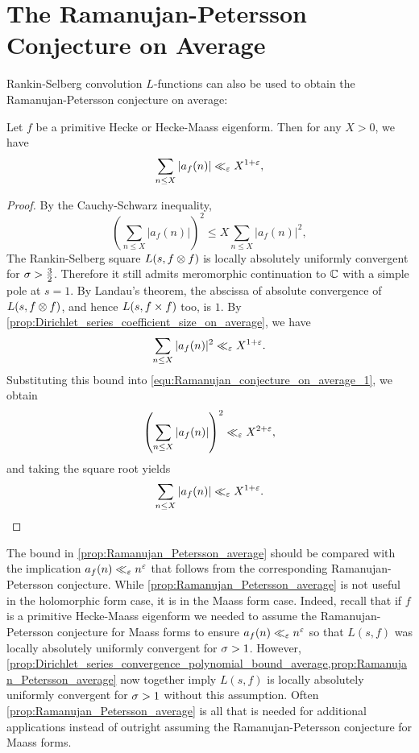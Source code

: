   \section{The Ramanujan-Petersson Conjecture on Average}
    Rankin-Selberg convolution $L$-functions can also be used to obtain the Ramanujan-Petersson conjecture on average:

    \begin{proposition}\label{prop:Ramanujan_Petersson_average}
      Let $f$ be a primitive Hecke or Hecke-Maass eigenform. Then for any $X > 0$, we have
      \[
      \sum_{n \le X}|a_{f}(n)| \ll_{\varepsilon} X^{1+\varepsilon},
      \]
    \end{proposition}
    \begin{proof}
      By the Cauchy-Schwarz inequality,
      \begin{equation}\label{equ:Ramanujan_conjecture_on_average_1}
        \left(\sum_{n \le X}|a_{f}(n)|\right)^{2} \le X\sum_{n \le X}|a_{f}(n)|^{2},
      \end{equation}
      The Rankin-Selberg square $L(s,f \otimes f)$ is locally absolutely uniformly convergent for $\sigma > \frac{3}{2}$. Therefore it still admits meromorphic continuation to $\mathbb{C}$ with a simple pole at $s = 1$. By Landau's theorem, the abscissa of absolute convergence of $L(s,f \otimes f)$, and hence $L(s,f \times f)$ too, is $1$. By \cref{prop:Dirichlet_series_coefficient_size_on_average}, we have
      \[
        \sum_{n \le X}|a_{f}(n)|^{2} \ll_{\varepsilon} X^{1+\varepsilon}.
      \]
      Substituting this bound into \cref{equ:Ramanujan_conjecture_on_average_1}, we obtain
      \[
        \left(\sum_{n \le X}|a_{f}(n)|\right)^{2} \ll_{\varepsilon} X^{2+\varepsilon},
      \]
      and taking the square root yields
      \[
        \sum_{n \le X}|a_{f}(n)| \ll_{\varepsilon} X^{1+\varepsilon}.
      \]
    \end{proof}

    The bound in \cref{prop:Ramanujan_Petersson_average} should be compared with the implication $a_{f}(n) \ll_{\varepsilon} n^{\varepsilon}$ that follows from the corresponding Ramanujan-Petersson conjecture. While \cref{prop:Ramanujan_Petersson_average} is not useful in the holomorphic form case, it is in the Maass form case. Indeed, recall that if $f$ is a primitive Hecke-Maass eigenform we needed to assume the Ramanujan-Petersson conjecture for Maass forms to ensure $a_{f}(n) \ll_{\varepsilon} n^{\varepsilon}$ so that $L(s,f)$ was locally absolutely uniformly convergent for $\sigma > 1$. However, \cref{prop:Dirichlet_series_convergence_polynomial_bound_average,prop:Ramanujan_Petersson_average} now together imply $L(s,f)$ is locally absolutely uniformly convergent for $\sigma > 1$ without this assumption. Often \cref{prop:Ramanujan_Petersson_average} is all that is needed for additional applications instead of outright assuming the Ramanujan-Petersson conjecture for Maass forms.